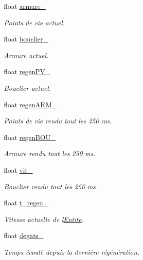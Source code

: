 \begin{DoxyCompactItemize}
float \hyperlink{class_entite_a014535fad669c3d890a216f9e8049d09}{armure\+\_\+}
\begin{DoxyCompactList}\small\item\em Points de vie actuel. \end{DoxyCompactList}\item 
float \hyperlink{class_entite_a933a79044c5ac6ffccd397c134248d44}{bouclier\+\_\+}
\begin{DoxyCompactList}\small\item\em Armure actuel. \end{DoxyCompactList}\item 
float \hyperlink{class_entite_a23d58f4c9b8593a6f0882240b1bf8e8e}{regen\+P\+V\+\_\+}
\begin{DoxyCompactList}\small\item\em Bouclier actuel. \end{DoxyCompactList}\item 
float \hyperlink{class_entite_af9b881b665c6997dcc56cd37fb839dce}{regen\+A\+R\+M\+\_\+}
\begin{DoxyCompactList}\small\item\em Points de vie rendu tout les 250 ms. \end{DoxyCompactList}\item 
float \hyperlink{class_entite_a12deb3f49595ab2cb4fc01a632a989e8}{regen\+B\+O\+U\+\_\+}
\begin{DoxyCompactList}\small\item\em Armure rendu tout les 250 ms. \end{DoxyCompactList}\item 
float \hyperlink{class_entite_aaacb36948d7853e03a7f9a42aa6ad2d5}{vit\+\_\+}
\begin{DoxyCompactList}\small\item\em Bouclier rendu tout les 250 ms. \end{DoxyCompactList}\item 
float \hyperlink{class_entite_a7ba3a09757f5fd29ec4e2c8e42f7b1e6}{t\+\_\+regen\+\_\+}
\begin{DoxyCompactList}\small\item\em Vitesse actuelle de l\textquotesingle{}\hyperlink{class_entite}{Entite}. \end{DoxyCompactList}\item 
float \hyperlink{class_entite_ac453832772daef8dc6eae431358a8e2a}{degats\+\_\+}
\begin{DoxyCompactList}\small\item\em Temps écoulé depuis la dernière régénération. \end{DoxyCompactList}\end{DoxyCompactItemize}
